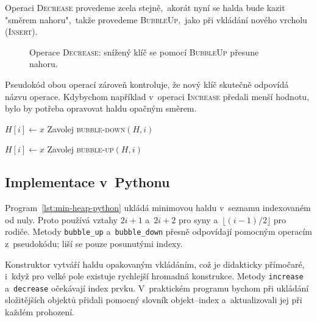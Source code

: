 Operaci \textsc{Decrease} provedeme zcela stejně,~akorát nyní se halda bude kazit "směrem nahoru",~takže provedeme \textsc{BubbleUp},~jako při vkládání nového vrcholu (\textsc{Insert}).

\begin{figure}[ht]
    \centering
    
    \caption{Operace \textsc{Decrease}: snížený klíč se pomocí \textsc{BubbleUp} přesune nahoru.}
    \label{fig:halda-decrease}
\end{figure}

Pseudokód obou operací zároveň kontroluje, že nový klíč skutečně odpovídá názvu operace. Kdybychom například v~operaci \textsc{Increase} předali menší hodnotu, bylo by potřeba opravovat haldu opačným směrem.
\begin{algorithm}
    \caption{\textsc{increase}}
    \label{alg:heap-increase}
    $H[i]\gets x$\;
    Zavolej \textsc{bubble-down}$(H,i)$\;
\end{algorithm}

\begin{algorithm}
    \caption{\textsc{decrease}}
    \label{alg:heap-decrease}
    $H[i]\gets x$\;
    Zavolej \textsc{bubble-up}$(H,i)$\;
\end{algorithm}

\subsection{Implementace v~Pythonu}

Program~\ref{lst:min-heap-python} ukládá minimovou haldu v~seznamu indexovaném od nuly. Proto používá vztahy $2i+1$ a~$2i+2$ pro syny a~$\lfloor(i-1)/2\rfloor$ pro rodiče. Metody \texttt{bubble\_up} a~\texttt{bubble\_down} přesně odpovídají pomocným operacím z~pseudokódu; liší se pouze posunutými indexy.

Konstruktor vytváří haldu opakovaným vkládáním, což je didakticky přímočaré, i~když pro velké pole existuje rychlejší hromadná konstrukce. Metody \texttt{increase} a~\texttt{decrease} očekávají index prvku. V~praktickém programu bychom při ukládání složitějších objektů přidali pomocný slovník objekt--index a~aktualizovali jej při každém prohození.

